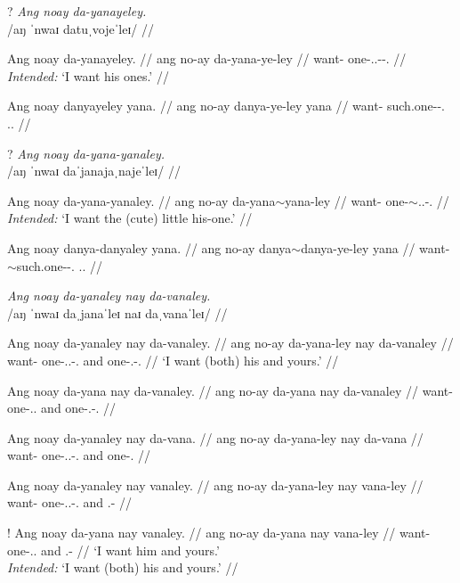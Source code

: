 \documentclass[12pt,a4paper]{scrartcl}
\newcommand{\PargI}{{\Parg}.{\Inan}}
\newcommand{\TsgM}{{\Tsg}.{\M}}
\newcommand{\til}{$\sim$} %
\begin{document}
\pex
\a\ljudge?\begingl
\glpreamble \textit{Ang noay da-yanayeley.} \\
	/aŋ ˈnwaɪ datuˌvojeˈleɪ/ //

\gla Ang noay da-yanayeley. //
\glb ang no-ay da-yana-ye-ley //
\glc \AgtT{} want-\Fsg{} one-\TsgM{}.\Gen{}-\Pl{}-\PargI{} //
\glft \textit{Intended:} `I want his ones.' //
\endgl

\a\ljudge*\begingl
\gla Ang noay danyayeley yana. //
\glb ang no-ay danya-ye-ley yana //
\glc \AgtT{} want-\Fsg{} such.one-\Pl{}-\PargI{} \TsgM{}.\Gen{} //
\endgl
\xe

\pex
\a\ljudge?\begingl
\glpreamble \textit{Ang noay da-yana-yanaley.} \\
	/aŋ ˈnwaɪ daˈjanajaˌnajeˈleɪ/ //

\gla Ang noay da-yana-yanaley. //
\glb ang no-ay da-yana\til{}yana-ley //
\glc \AgtT{} want-\Fsg{} one-\Dim{}\til{}\TsgM{}.\Gen{}-\PargI{} //
\glft \textit{Intended:} `I want the (cute) little his-one.' //
\endgl

\a\ljudge*\begingl
\gla Ang noay danya-danyaley yana. //
\glb ang no-ay danya\til{}danya-ye-ley yana //
\glc \AgtT{} want-\Fsg{} \Dim{}\til{}such.one-\Pl{}-\PargI{} \TsgM{}.\Gen{} //
\endgl

\xe

\pex
\a\begingl
\glpreamble \textit{Ang noay da-yanaley nay da-vanaley.} \\
	/aŋ ˈnwaɪ daˌjanaˈleɪ naɪ daˌvanaˈleɪ/ //

\gla Ang noay da-yanaley nay da-vanaley. //
\glb ang no-ay da-yana-ley nay da-vanaley //
\glc \AgtT{} want-\Fsg{} one-\TsgM{}.\Gen{}-\PargI{} and one-\Second{}.\Gen{}-\PargI{} //
\glft `I want (both) his and yours.' //
\endgl

\a\ljudge*\begingl
\gla Ang noay da-yana nay da-vanaley. //
\glb ang no-ay da-yana nay da-vanaley //
\glc \AgtT{} want-\Fsg{} one-\TsgM{}.\Gen{} and one-\Second{}.\Gen{}-\PargI{} //
\endgl

\a\ljudge*\begingl
\gla Ang noay da-yanaley nay da-vana. //
\glb ang no-ay da-yana-ley nay da-vana //
\glc \AgtT{} want-\Fsg{} one-\TsgM{}.\Gen{}-\PargI{} and one-\Second{}.\Gen{} //
\endgl

\a\ljudge*\begingl
\gla Ang noay da-yanaley nay vanaley. //
\glb ang no-ay da-yana-ley nay vana-ley //
\glc \AgtT{} want-\Fsg{} one-\TsgM{}.\Gen{}-\PargI{} and \Second{}.\Gen{}-\Parg{} //
\endgl

\a\ljudge!\begingl
\gla Ang noay da-yana nay vanaley. //
\glb ang no-ay da-yana nay vana-ley //
\glc \AgtT{} want-\Fsg{} one-\TsgM{}.\Gen{} and \Second{}.\Gen{}-\Parg{} //
\glft `I want him and yours.' \\
	\textit{Intended:} `I want (both) his and yours.' //
\endgl
\end{document}
